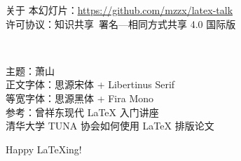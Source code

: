 \begin{frame}{关于}
  \vspace*{1cm}
  \footnotesize
  本幻灯片：\url{https://github.com/mzzx/latex-talk}\\
  许可协议：知识共享~署名—相同方式共享 4.0 国际版 
  \vspace{0.5cm}
  \begin{center}
    \huge
    \faCreativeCommons\,\faCreativeCommonsBy\,\faCreativeCommonsSa
  \end{center}
  \vspace{1cm}
  \begin{flushleft}
    \tiny
    主题：萧山  \\
    正文字体：思源宋体 + Libertinus Serif \\
    等宽字体：思源黑体 + Fira Mono \\
    参考：曾祥东\quad 现代 \LaTeX{} 入门讲座  \\
    \phantom{参考：}清华大学 TUNA 协会\quad 如何使用 \LaTeX{} 排版论文 
  \end{flushleft}
\end{frame}

\begin{frame}
  \begin{center}
    \Huge Happy \LaTeX{ing}!
  \end{center}
\end{frame}
